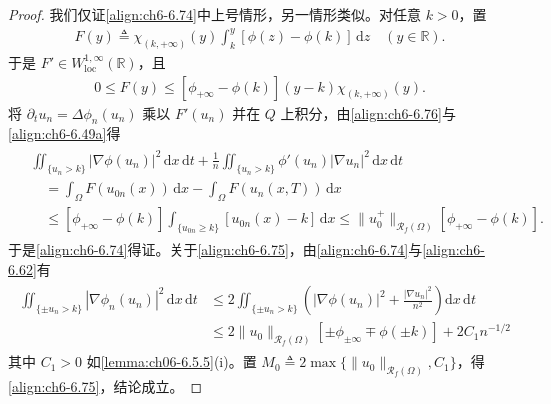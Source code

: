 \documentclass[../../main.tex]{subfiles}%
\begin{document}
\begin{proof}
我们仅证\eqref{align:ch6-6.74}中上号情形，另一情形类似。对任意 $k>0$，置
\begin{align*}
F(y)\triangleq \chi_{(k,+\infty)}(y)\int_k^y[\phi(z)-\phi(k)]\,\mathrm{d}z \quad(y\in\mathbb{R}).
\end{align*}
于是 $F'\in W^{1,\infty}_{\mathrm{loc}}(\mathbb{R})$，且
\begin{align}
0\leqslant F(y)\leqslant[\phi_{+\infty}-\phi(k)](y-k)\chi_{(k,+\infty)}(y). \label{align:ch6-6.76}
\end{align}
将 $\partial_t u_n=\Delta\phi_n(u_n)$ 乘以 $F'(u_n)$ 并在 $Q$ 上积分，由\eqref{align:ch6-6.76}与\eqref{align:ch6-6.49a}得
\begin{align*}
\begin{aligned}
&\iint_{\{u_n>k\}}|\nabla\phi(u_n)|^2\,\mathrm{d}x\,\mathrm{d}t
+\frac{1}{n}\iint_{\{u_n>k\}}\phi'(u_n)|\nabla u_n|^2\,\mathrm{d}x\,\mathrm{d}t\\
&\quad=\int_\Omega F(u_{0n}(x))\,\mathrm{d}x-\int_\Omega F(u_n(x,T))\,\mathrm{d}x\\
&\quad\leqslant[\phi_{+\infty}-\phi(k)]\int_{\{u_{0n}\geqslant k\}}[u_{0n}(x)-k]\,\mathrm{d}x
\leqslant\|u^+_0\|_{\mathscr{R}_f(\Omega)}[\phi_{+\infty}-\phi(k)].
\end{aligned}
\end{align*}
于是\eqref{align:ch6-6.74}得证。关于\eqref{align:ch6-6.75}，由\eqref{align:ch6-6.74}与\eqref{align:ch6-6.62}有
\begin{align*}
\begin{aligned}
\iint_{\{\pm u_n>k\}}|\nabla\phi_n(u_n)|^2\,\mathrm{d}x\,\mathrm{d}t
&\leqslant2\iint_{\{\pm u_n>k\}}\left(|\nabla\phi(u_n)|^2+\frac{|\nabla u_n|^2}{n^2}\right)\mathrm{d}x\,\mathrm{d}t\\
&\leqslant2\|u_0\|_{\mathscr{R}_f(\Omega)}[\pm\phi_{\pm\infty}\mp\phi(\pm k)]
+2C_1n^{-1/2}
\end{aligned}
\end{align*}
其中 $C_1>0$ 如\cref{lemma:ch06-6.5.5}(i)。置 $M_0\triangleq 2\max\{\|u_0\|_{\mathscr{R}_f(\Omega)},C_1\}$，得\eqref{align:ch6-6.75}，结论成立。
\end{proof}
\end{document}
